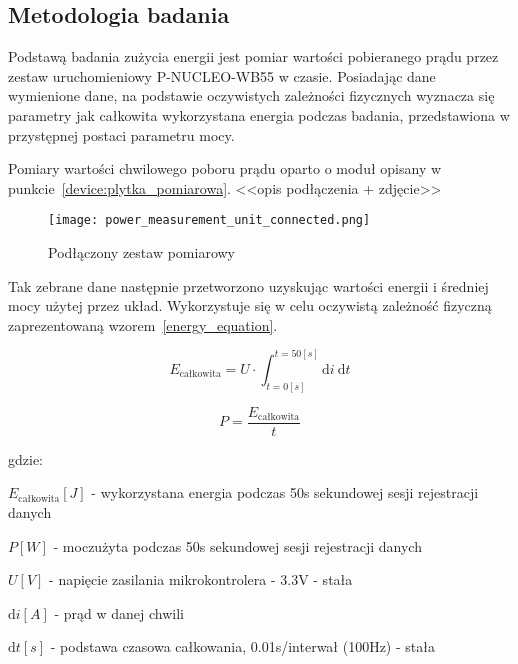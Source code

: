 \subsection{Metodologia badania}

Podstawą badania zużycia energii jest pomiar wartości pobieranego prądu przez zestaw uruchomieniowy
P-NUCLEO-WB55 w czasie. Posiadając dane wymienione dane, na podstawie oczywistych
zależności fizycznych wyznacza się parametry jak całkowita wykorzystana energia
podczas badania, przedstawiona w przystępnej postaci parametru mocy.

Pomiary wartości chwilowego poboru prądu oparto o moduł opisany w punkcie~\ref{device:plytka_pomiarowa}.
<<opis podłączenia + zdjęcie>>

\begin{figure}[!htb]
	\centering \texttt{[image: power\_measurement\_unit\_connected.png]}
	\caption{Podłączony zestaw pomiarowy}
	\label{rys:connected_power_measurement_unit}
\end{figure}

Tak zebrane dane następnie przetworzono uzyskując wartości energii i średniej mocy
użytej przez układ. Wykorzystuje się w celu oczywistą zależność fizyczną zaprezentowaną
wzorem~\ref{energy_equation}\cite{skoro_marta_fizyka_1973}.

\begin{equation} \label{energy_equation}
E_{\text{całkowita}} = U \cdot \int_{t=0[s]}^{t=50[s]} \mathrm{d}i \: \mathrm{d} t
\end{equation}

\begin{equation} \label{power_equation}
P = \frac{E_{\text{całkowita}}}{t}
\end{equation}

gdzie:

\begin{description}
\item $E_{\text{całkowita}} [J]$ - wykorzystana energia podczas 50s sekundowej sesji rejestracji danych
\item $P [W]$ - moczużyta podczas 50s sekundowej sesji rejestracji danych
\item $U [V]$ - napięcie zasilania mikrokontrolera - 3.3V - stała
\item $\mathrm{d}i [A]$ - prąd w danej chwili
\item $\mathrm{d}t [s]$ - podstawa czasowa całkowania, 0.01s/interwał (100Hz) - stała 
\end{description}

